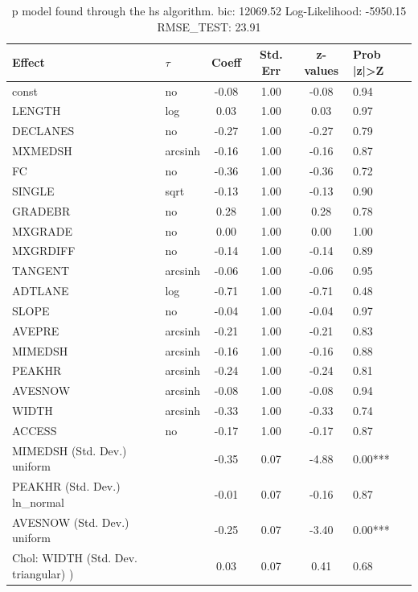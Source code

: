 \begin{table}
	\caption{p model found through the hs algorithm. bic: 12069.52 Log-Likelihood: -5950.15 RMSE_TEST: 23.91}
	\begin{center}
		\begin{tabular}{|l|l|c|c|c|l|}
			\hline
			Effect & $\tau$ & Coeff & Std. Err & z-values & Prob |z|>Z \\
			\hline
			const & no & -0.08 & 1.00 & -0.08 & 0.94 \\
			\hline
			LENGTH & log & 0.03 & 1.00 & 0.03 & 0.97 \\
			\hline
			DECLANES & no & -0.27 & 1.00 & -0.27 & 0.79 \\
			\hline
			MXMEDSH & arcsinh & -0.16 & 1.00 & -0.16 & 0.87 \\
			\hline
			FC & no & -0.36 & 1.00 & -0.36 & 0.72 \\
			\hline
			SINGLE & sqrt & -0.13 & 1.00 & -0.13 & 0.90 \\
			\hline
			GRADEBR & no & 0.28 & 1.00 & 0.28 & 0.78 \\
			\hline
			MXGRADE & no & 0.00 & 1.00 & 0.00 & 1.00 \\
			\hline
			MXGRDIFF & no & -0.14 & 1.00 & -0.14 & 0.89 \\
			\hline
			TANGENT & arcsinh & -0.06 & 1.00 & -0.06 & 0.95 \\
			\hline
			ADTLANE & log & -0.71 & 1.00 & -0.71 & 0.48 \\
			\hline
			SLOPE & no & -0.04 & 1.00 & -0.04 & 0.97 \\
			\hline
			AVEPRE & arcsinh & -0.21 & 1.00 & -0.21 & 0.83 \\
			\hline
			MIMEDSH & arcsinh & -0.16 & 1.00 & -0.16 & 0.88 \\
			\hline
			PEAKHR & arcsinh & -0.24 & 1.00 & -0.24 & 0.81 \\
			\hline
			AVESNOW & arcsinh & -0.08 & 1.00 & -0.08 & 0.94 \\
			\hline
			WIDTH & arcsinh & -0.33 & 1.00 & -0.33 & 0.74 \\
			\hline
			ACCESS & no & -0.17 & 1.00 & -0.17 & 0.87 \\
			\hline
			MIMEDSH (Std. Dev.) uniform &  & -0.35 & 0.07 & -4.88 & 0.00*** \\
			\hline
			PEAKHR (Std. Dev.) ln_normal &  & -0.01 & 0.07 & -0.16 & 0.87 \\
			\hline
			AVESNOW (Std. Dev.) uniform &  & -0.25 & 0.07 & -3.40 & 0.00*** \\
			\hline
			 Chol: WIDTH (Std. Dev. triangular) ) &  & 0.03 & 0.07 & 0.41 & 0.68 \\

\end{tabular}
\end{center}
\end{table}

